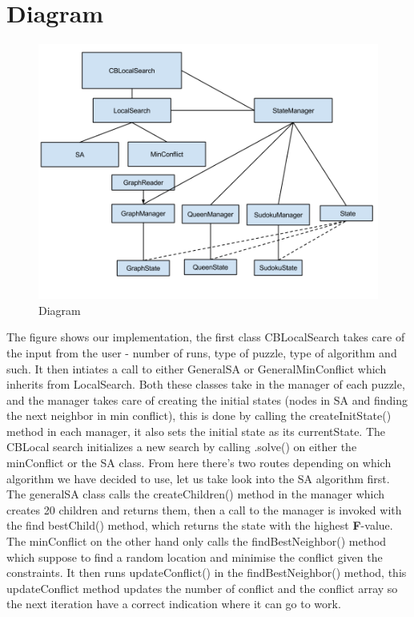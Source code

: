 \documentclass[12pt, a4paper]{article}
\begin{document}
\section{Diagram}
\begin{figure}[H] \includegraphics[width=15cm]{2_Diagram}

\caption{Diagram}
\label{diagram}
\end{figure}
The figure shows our implementation, the first class CBLocalSearch takes care of the input from the user - number of runs, type of puzzle, type of algorithm and such. It then intiates a
call to either GeneralSA or GeneralMinConflict which inherits from LocalSearch. Both these classes take in the manager of each puzzle, and the manager takes care of creating the initial states (nodes in SA and finding the next neighbor in min conflict), this is done by calling the createInitState() method in each manager, it also sets the initial state as its currentState.
The CBLocal search initializes a new search by calling .solve() on either the minConflict or the SA class. From here there's two routes depending on which algorithm we have decided to use, let us take look into the SA algorithm first. The generalSA class calls the createChildren() method in the manager which creates 20 children and returns them, then a call to the manager is invoked with the find bestChild() method, which returns the state with the highest \textbf{F}-value. \\
The minConflict on the other hand only calls the findBestNeighbor() method which suppose to find a random location and minimise the conflict given the constraints. It then runs updateConflict() in the findBestNeighbor() method, this updateConflict method updates the number of conflict and the conflict array so the next iteration have a correct indication where it can go to work.\\
\end{document}
